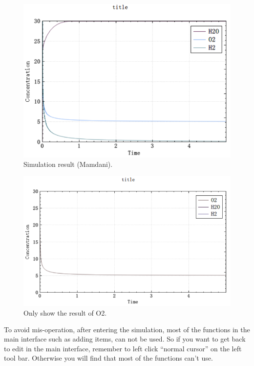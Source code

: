\documentclass[journal,a4paper,onecolumn]{article}
\begin{document}
\begin{figure}[!hbt]
	\begin{center}
		\includegraphics[width=\columnwidth]{fig14}
		\caption{Simulation result (Mamdani).}
		\label{fig:Simulation result (Mamdani)}
	\end{center}
\end{figure}

\begin{figure}[!hbt]
	\begin{center}
		\includegraphics[width=\columnwidth]{fig18}
		\caption{Only show the result of O2.}
		\label{fig:Only show the result of O2}
	\end{center}
\end{figure}

To avoid mis-operation, after entering the simulation, most of the functions in the main interface such as adding items, can not be used. So if you want to get back to edit in the main interface, remember to left click ``normal cursor'' on the left tool bar. Otherwise you will find that most of the functions can't use.
\end{document}
